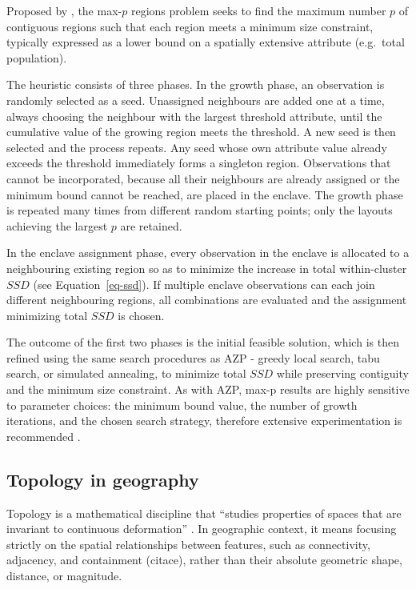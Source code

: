 \documentclass[
  english,
  12pt,
  a4paper,
]{article}
\begin{document}
Proposed by \citet{duque2012}, the max-\(p\) regions problem seeks to
find the maximum number \(p\) of contiguous regions such that each
region meets a minimum size constraint, typically expressed as a lower
bound on a spatially extensive attribute (e.g.~total population).

The heuristic consists of three phases. In the growth phase, an
observation is randomly selected as a seed. Unassigned neighbours are
added one at a time, always choosing the neighbour with the largest
threshold attribute, until the cumulative value of the growing region
meets the threshold. A new seed is then selected and the process
repeats. Any seed whose own attribute value already exceeds the
threshold immediately forms a singleton region. Observations that cannot
be incorporated, because all their neighbours are already assigned or
the minimum bound cannot be reached, are placed in the enclave. The
growth phase is repeated many times from different random starting
points; only the layouts achieving the largest \(p\) are retained.

In the enclave assignment phase, every observation in the enclave is
allocated to a neighbouring existing region so as to minimize the
increase in total within-cluster \(SSD\) (see Equation~\ref{eq-ssd}). If
multiple enclave observations can each join different neighbouring
regions, all combinations are evaluated and the assignment minimizing
total \(SSD\) is chosen.

The outcome of the first two phases is the initial feasible solution,
which is then refined using the same search procedures as AZP - greedy
local search, tabu search, or simulated annealing, to minimize total
\(SSD\) while preserving contiguity and the minimum size constraint. As
with AZP, max-p results are highly sensitive to parameter choices: the
minimum bound value, the number of growth iterations, and the chosen
search strategy, therefore extensive experimentation is recommended
\citep{anselin2024}.

\subsection{Topology in geography}\label{topology-in-geography}

Topology is a mathematical discipline that ``studies properties of
spaces that are invariant to continuous deformation''
\citep{waterloo_topology}. In geographic context, it means focusing
strictly on the spatial relationships between features, such as
connectivity, adjacency, and containment (citace), rather than their
absolute geometric shape, distance, or magnitude.
\end{document}
